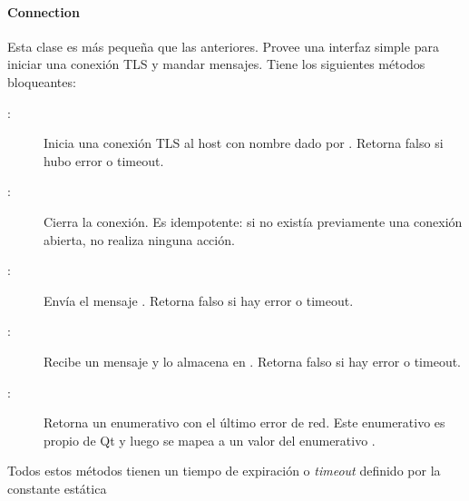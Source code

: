 \paragraph{Connection}
Esta clase es más pequeña que las anteriores. Provee una interfaz simple para iniciar una conexión TLS y mandar mensajes. Tiene los siguientes métodos bloqueantes:
\begin{description}
	\item[:] Inicia una conexión TLS al host con nombre dado por . Retorna falso si hubo error o timeout.
	\item[:] Cierra la conexión. Es idempotente: si no existía previamente una conexión abierta, no realiza ninguna acción.
	\item[:] Envía el mensaje . Retorna falso si hay error o timeout.
	\item[:] Recibe un mensaje y lo almacena en . Retorna falso si hay error o timeout.
	\item[:] Retorna un enumerativo con el último error de red. Este enumerativo es propio de Qt y luego se mapea a un valor del enumerativo .
\end{description}

Todos estos métodos tienen un tiempo de expiración o \emph{timeout} definido por la constante estática 


